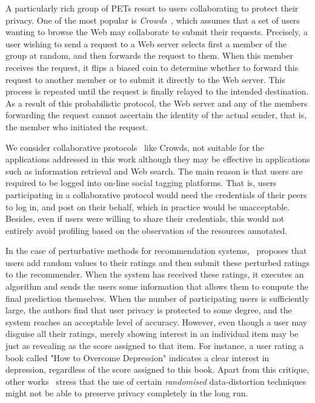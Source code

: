A particularly rich group of PETs resort to users collaborating to protect their privacy. One of the most popular is \emph{Crowds}~\cite{Reiter98ISS}, which assumes that a set of users wanting to browse the Web may collaborate to submit their requests. Precisely, a user wishing to send a request to a Web server selects first a member of the group at random, and then forwards the request to them. When this member receives the request, it flips a biased coin to determine whether to forward this request to another member or to submit it directly to the Web server. This process is repeated until the request is finally relayed to the intended destination. As a result of this probabilistic protocol, the Web server and any of the members forwarding the request cannot ascertain the identity of the actual sender, that is, the member who initiated the request.

We consider collaborative protocols~\cite{Domingo09DKE,Rebollo09COMCOM,Domingo12INS} like Crowds, not suitable for the applications addressed in this work although they may be effective in applications such as information retrieval and Web search. The main reason is that users are required to be logged into on-line social tagging platforms. That is, users participating in a collaborative protocol would need the credentials of their peers to log in, and post on their behalf, which in practice would be unacceptable. Besides, even if users were willing to share their credentials, this would not entirely avoid profiling based on the observation of the resources annotated.

In the case of perturbative methods for recommendation systems, \cite{Polat03SDM}~proposes that users add random values to their ratings and then submit these perturbed ratings to the recommender. When the system has received these ratings, it executes an algorithm and sends the users some information that allows them to compute the final prediction themselves. When the number of participating users is sufficiently large, the authors find that user privacy is protected to some degree, and the system reaches an acceptable level of accuracy. However, even though a user may disguise all their ratings, merely showing interest in an individual item may be just as revealing as the score assigned to that item. For instance, a user rating a book called "How to Overcome Depression" indicates a clear interest in depression, regardless of the score assigned to this book. Apart from this critique, other works~\cite{Kargupta03ICDM,Huang05SIGMOD} stress that the use of certain \emph{randomised} data-distortion techniques might not be able to preserve privacy completely in the long run.

